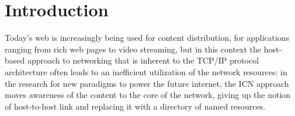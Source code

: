 \documentclass[11pt,a4paper,twoside,titlepage,openany]{book}
\begin{document}






\chapter{Introduction}
\label{chap:intro}

Today's web is increasingly being used for content distribution, for applications ranging from rich web pages   to video streaming, but in this context the host-based approach to networking that is inherent to the TCP/IP protocol architecture often leads to an inefficient utilization of the network resources: in the research for new paradigms to power the future   internet, the \gls{ICN} approach moves awareness of the content to the core of the   network, giving up the notion of host-to-host link and replacing it with a directory of named resources.
\end{document}
